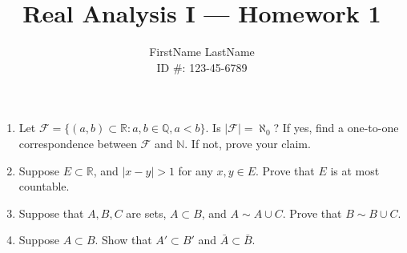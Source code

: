 \documentclass{article}
\title{Real Analysis I --- Homework 1}
\author{FirstName LastName \\ ID \#: 123-45-6789}
\date{}
\begin{document}
\maketitle

\begin{enumerate}

\item Let $\mathcal{F} = \{(a,b) \subset \mathbb{R}: a, b \in \mathbb{Q}, a<b\}$. Is $|\mathcal{F}| = \aleph_{0}$? If yes, find a one-to-one correspondence between $\mathcal{F}$ and $\mathbb{N}$. If not, prove your claim.




\item Suppose $E \subset \mathbb{R}$, and $|x-y|>1$ for any $x,y\in E$. Prove that $E$ is at most countable.




\item Suppose that $A, B, C$ are sets, $A \subset B$, and $A \sim A \cup C$. Prove that $B \sim B\cup C$.




\item Suppose $A \subset B$. Show that $A' \subset B'$ and $\bar{A} \subset \bar{B}$.




\end{enumerate}
\end{document}
